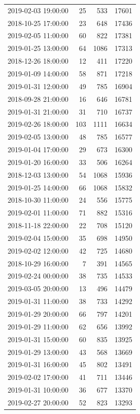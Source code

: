 \begin{tabular}{lrrr}
2019-02-03 19:00:00 & 25 & 533 & 17601 \\
2018-10-25 17:00:00 & 23 & 648 & 17436 \\
2019-02-05 11:00:00 & 60 & 822 & 17381 \\
2019-01-25 13:00:00 & 64 & 1086 & 17313 \\
2018-12-26 18:00:00 & 12 & 411 & 17220 \\
2019-01-09 14:00:00 & 58 & 871 & 17218 \\
2019-01-31 12:00:00 & 49 & 785 & 16904 \\
2018-09-28 21:00:00 & 16 & 646 & 16781 \\
2019-01-31 21:00:00 & 31 & 710 & 16737 \\
2019-02-26 18:00:00 & 103 & 1111 & 16634 \\
2019-02-05 13:00:00 & 48 & 785 & 16577 \\
2019-01-04 17:00:00 & 29 & 673 & 16300 \\
2019-01-20 16:00:00 & 33 & 506 & 16264 \\
2018-12-03 13:00:00 & 54 & 1068 & 15936 \\
2019-01-25 14:00:00 & 66 & 1068 & 15832 \\
2018-10-30 11:00:00 & 24 & 556 & 15775 \\
2019-02-01 11:00:00 & 71 & 882 & 15316 \\
2018-11-18 22:00:00 & 22 & 708 & 15120 \\
2019-02-04 15:00:00 & 35 & 698 & 14950 \\
2019-02-02 12:00:00 & 42 & 725 & 14680 \\
2018-10-29 16:00:00 & 7 & 391 & 14565 \\
2019-02-24 00:00:00 & 38 & 735 & 14533 \\
2019-03-05 20:00:00 & 13 & 496 & 14479 \\
2019-01-31 11:00:00 & 38 & 733 & 14292 \\
2019-01-29 20:00:00 & 66 & 797 & 14201 \\
2019-01-29 11:00:00 & 62 & 656 & 13992 \\
2019-01-31 15:00:00 & 60 & 835 & 13925 \\
2019-01-29 13:00:00 & 43 & 568 & 13669 \\
2019-01-31 16:00:00 & 45 & 802 & 13491 \\
2019-02-02 17:00:00 & 41 & 711 & 13446 \\
2019-01-31 10:00:00 & 36 & 677 & 13370 \\
2019-02-27 20:00:00 & 52 & 823 & 13293 \\

\end{tabular}
